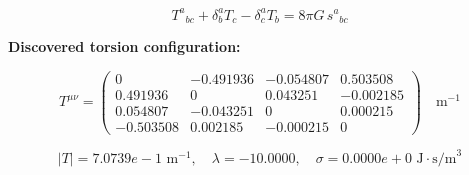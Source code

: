 
\begin{equation}
  T^a{}_{bc} + \delta^a_b T_c - \delta^a_c T_b = 8\pi G \, s^a{}_{bc}
\end{equation}

\textbf{Discovered torsion configuration:}

\begin{equation}
  T^{\mu\nu} = \begin{pmatrix}
    0 & -0.491936 & -0.054807 & 0.503508 \\
    0.491936 & 0 & 0.043251 & -0.002185 \\
    0.054807 & -0.043251 & 0 & 0.000215 \\
    -0.503508 & 0.002185 & -0.000215 & 0
  \end{pmatrix} \quad \text{m}^{-1}
\end{equation}

\begin{equation}
  |T| = 7.0739e-1 \text{ m}^{-1}, \quad
  \lambda = -10.0000, \quad
  \sigma = 0.0000e+0 \text{ J}\cdot\text{s/m}^3
\end{equation}